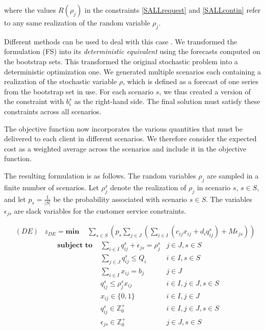 \documentclass[preprint,11pt,authoryear]{elsarticle}
\begin{document}
\noindent where the values $R(\rho_j)$ in the constraints \ref{SALLrequest} and \ref{SALLcontin} refer to any same realization of the random variable $\rho_j$.

Different methods can be used to deal with this case \citep{SDR09}. We transformed the formulation (FS) into its {\it deterministic equivalent} \citep{D55} using the forecasts computed on the bootstrap sets. This transformed the original stochastic problem into a deterministic optimization one. We generated multiple scenarios each containing a realization of the stochastic variable $\rho$, which is defined as a forecast of one series from the bootstrap set in use. For each scenario $s$, we thus created a version of the constraint with $b_i^{s}$ as the right-hand side. The final solution must satisfy these constraints across all scenarios.

The objective function now incorporates the various quantities that must be delivered to each client in different scenarios. We therefore consider the expected cost as a weighted average across the scenarios and include it in the objective function. 

The resulting formulation is as follows. The random variables $\rho_j$ are sampled in a finite number of scenarios. Let $\rho^s_j$ denote the realization of $\rho_j$ in scenario $s$, $s \in S$, and let $p_s = \frac{1}{|S|}$ be the probability associated with scenario $s \in S$. The variables $\epsilon_{js}$ are slack variables for the customer service constraints.

\begin{align}
	&(DE) & z_{DE} = \textbf{min } & \sum_{s \in S} \left( p_s \sum_{j \in J} \left( \sum_{i \in I} ( c_{ij}x_{ij} + d_i q_{ij}^s) + M \epsilon_{js} \right) \right) \label{DEobj}
\end{align}
\begin{align}
	& &  \textbf{subject to }
	& \sum_{i \in I} q_{ij}^s + \epsilon_{js} = \rho_j^s & j \in J, s \in S \label{DErequest}\\
	& &  & \sum_{j \in J}q_{ij}^s \leq Q_i & i \in I, s \in S \label{DEcapacity}\\
	& &  & \sum_{i \in I} x_{ij} = b_j & j \in J  \label{DEnumserv}\\
	& &  & q_{ij}^s \leq \rho_j^s x_{ij} & i \in I, j \in J, s \in S \label{DEcontin}\\
	& &  & x_{ij} \in \{0,1\} & i\in I, j \in J \label{DEx}\\
	& &  & q_{ij}^s \in \mathbb{Z}^+_0 & i\in I, j \in J, s \in S \label{DEq}\\
	& &  & \epsilon_{js} \in \mathbb{Z}^+_0 & j \in J, s \in S \label{DEeps}
\end{align}
\end{document}
